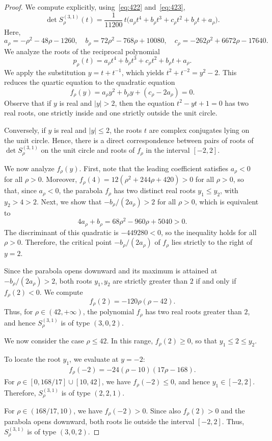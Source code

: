 \documentclass[addpoints,12pt,letter]{article}
\newcommand{\nf}{\infty}
\newcommand{\SR}{S}
\renewcommand{\ge}{\geqslant}
\renewcommand{\le}{\leqslant}
\numberwithin{equation}{section}
\theoremstyle{definition}
\begin{document}
\begin{proof}
We compute explicitly, using~\eqref{eq:422} and~\eqref{eq:423},
\[
\det \SR_{\rho}^{(3,1)}(t)=\frac{1}{11200}\, t \big(a_{\rho} t^{4}+b_{\rho} t^{3}+c_{\rho} t^{2}+b_{\rho} t+a_{\rho}\big).
\]
Here,
\[
a_{\rho}=-\rho^{2}-48\rho-1260,\quad
b_{\rho}=72\rho^{2}-768\rho+10080,\quad
c_{\rho}=-262\rho^{2}+6672\rho-17640.
\]
We analyze the roots of the reciprocal polynomial
\[
p_{\rho}(t)=a_{\rho} t^{4}+b_{\rho} t^{3}+c_{\rho} t^{2}+b_{\rho} t+a_{\rho}.
\]
We apply the substitution $y=t+t^{-1}$, which yields $t^{2}+t^{-2}=y^{2}-2$.
This reduces the quartic equation to the quadratic equation
\[
f_{\rho}(y)=a_{\rho} y^{2}+b_{\rho} y+(c_{\rho}-2a_{\rho})=0.
\]
Observe that if $y$ is real and $|y|>2$, then the equation $t^{2}-y t+1=0$ has two real roots, one strictly inside and one strictly outside the unit circle.

Conversely, if $y$ is real and $|y|\le 2$, the roots $t$ are complex conjugates lying on the unit circle.
Hence, there is a direct correspondence between pairs of roots of $\det \SR_{\rho}^{(3,1)}$ on the unit circle and roots of $f_{\rho}$ in the interval $[-2,2]$.

We now analyze $f_{\rho}(y)$.
First, note that the leading coefficient satisfies $a_{\rho}<0$ for all $\rho>0$. Moreover, $f_{\rho}(4)=12(\rho^{2}+244\rho+420)>0$ for all $\rho>0$, so that, since $a_{\rho}<0$, the parabola $f_{\rho}$ has two distinct real roots $y_{1}\le y_{2}$, with $y_{2}>4>2$.
Next, we show that $-b_{\rho}/(2a_{\rho})>2$ for all $\rho>0$, which is equivalent to
\[
4a_{\rho}+b_{\rho}=68\rho^{2}-960\rho+5040>0.
\]
The discriminant of this quadratic is $-449280<0$, so the inequality holds for all $\rho>0$.
Therefore, the critical point $-b_{\rho}/(2a_{\rho})$ of $f_{\rho}$ lies strictly to the right of $y=2$.

Since the parabola opens downward and its maximum is attained at $-b_{\rho}/(2a_{\rho})>2$, both roots $y_{1},y_{2}$ are strictly greater than $2$ if and only if $f_{\rho}(2)<0$.
We compute
\[
f_{\rho}(2)=-120\rho(\rho-42).
\]
Thus, for $\rho\in (42,+\nf)$, the polynomial $f_{\rho}$ has two real roots greater than $2$, and hence $\SR_{\rho}^{(3,1)}$ is of type $(3,0,2)$.

We now consider the case $\rho\le 42$.
In this range, $f_{\rho}(2)\ge 0$, so that $y_{1}\le 2\le y_{2}$.

To locate the root $y_{1}$, we evaluate at $y=-2$:
\begin{align*}
f_{\rho}(-2)=-24(\rho-10)(17\rho-168).
\end{align*}
For $\rho\in [0,168/17]\cup [10,42]$, we have $f_{\rho}(-2)\le 0$, and hence $y_{1}\in [-2,2]$.
Therefore, $\SR_{\rho}^{(3,1)}$ is of type $(2,2,1)$.

For $\rho\in (168/17,10)$, we have $f_{\rho}(-2)>0$.
Since also $f_{\rho}(2)>0$ and the parabola opens downward, both roots lie outside the interval $[-2,2]$.
Thus, $\SR_{\rho}^{(3,1)}$ is of type $(3,0,2)$.
\end{proof}
\end{document}
